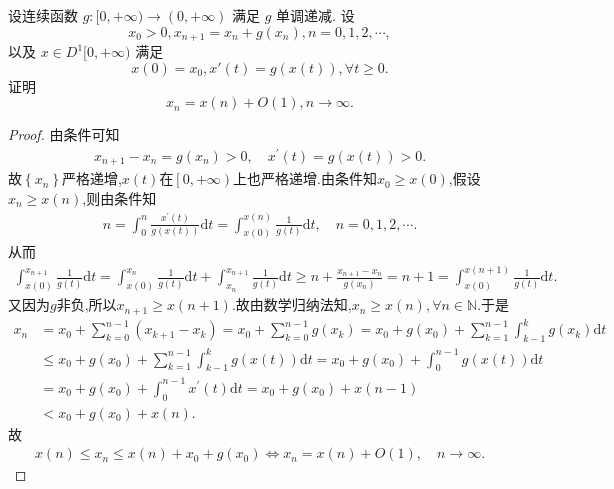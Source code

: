 \documentclass[../../main.tex]{subfiles}
\begin{document}
\begin{example}
设连续函数 $g:[0,+\infty)\to(0,+\infty)$ 满足 $g$ 单调递减. 设
\[
x_0>0, x_{n+1}=x_n+g(x_n), n=0,1,2,\cdots,
\]
以及 $x\in D^1[0,+\infty)$ 满足
\[
x(0)=x_0 ,x'(t)=g(x(t)), \forall t\geqslant0.
\]
证明
\[
x_n=x(n)+O(1), n\to\infty.
\]
\end{example}
\begin{proof}
由条件可知
\begin{align*}
x_{n+1}-x_n=g\left( x_n \right) >0,\quad x^\prime \left( t \right) =g\left( x\left( t \right) \right) >0.
\end{align*}
故$\left\{ x_n \right\}$严格递增,$x\left( t \right)$在$\left[ 0,+\infty \right)$上也严格递增.由条件知$x_0\geqslant x\left( 0 \right)$,假设$x_n\geqslant x\left( n \right)$,则由条件知
\begin{align*}
n=\int_0^n{\frac{x^\prime \left( t \right)}{g\left( x(t) \right)}\mathrm{d}t}=\int_{x\left( 0 \right)}^{x\left( n \right)}{\frac{1}{g\left( t \right)}\mathrm{d}t},\quad n=0,1,2,\cdots .
\end{align*}
从而
\begin{align*}
\int_{x\left( 0 \right)}^{x_{n+1}}{\frac{1}{g\left( t \right)}\mathrm{d}t}=\int_{x\left( 0 \right)}^{x_n}{\frac{1}{g\left( t \right)}\mathrm{d}t}+\int_{x_n}^{x_{n+1}}{\frac{1}{g\left( t \right)}\mathrm{d}t}\geqslant n+\frac{x_{n+1}-x_n}{g\left( x_n \right)}=n+1=\int_{x\left( 0 \right)}^{x\left( n+1 \right)}{\frac{1}{g\left( t \right)}\mathrm{d}t}.
\end{align*}
又因为$g$非负,所以$x_{n+1}\geqslant x\left( n+1 \right)$.故由数学归纳法知,$x_n\geqslant x\left( n \right),\forall n\in \mathbb{N}$.于是
\begin{align*}
x_n&=x_0+\sum\limits_{k=0}^{n-1}{\left( x_{k+1}-x_k \right)}=x_0+\sum\limits_{k=0}^{n-1}{g\left( x_k \right)}=x_0+g\left( x_0 \right) +\sum\limits_{k=1}^{n-1}{\int_{k-1}^k{g\left( x_k \right) \mathrm{d}t}}
\\
&\leqslant x_0+g\left( x_0 \right) +\sum\limits_{k=1}^{n-1}{\int_{k-1}^k{g\left( x\left( t \right) \right) \mathrm{d}t}}=x_0+g\left( x_0 \right) +\int_0^{n-1}{g\left( x\left( t \right) \right) \mathrm{d}t}
\\
&=x_0+g\left( x_0 \right) +\int_0^{n-1}{x^\prime \left( t \right) \mathrm{d}t}=x_0+g\left( x_0 \right) +x\left( n-1 \right) 
\\
&<x_0+g\left( x_0 \right) +x\left( n \right) .
\end{align*}
故
\begin{align*}
x\left( n \right) \leqslant x_n\leqslant x\left( n \right) +x_0+g\left( x_0 \right) \Longleftrightarrow x_n=x\left( n \right) +O\left( 1 \right) ,\quad n\rightarrow \infty .
\end{align*}

\end{proof}
\end{document}
